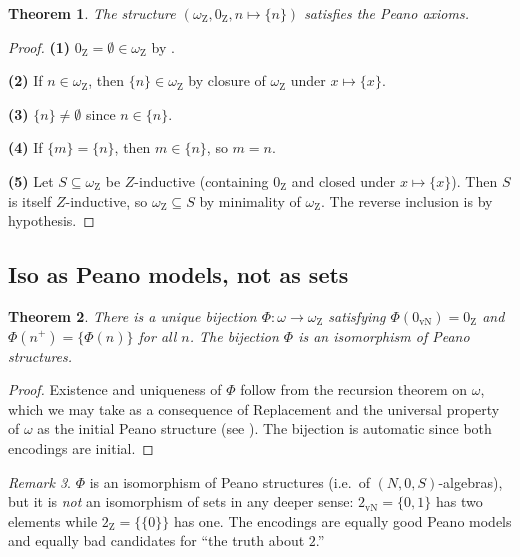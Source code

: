 \documentclass[12pt]{article}
\newtheorem{theorem}{Theorem}[section]
\theoremstyle{definition}
\theoremstyle{remark}
\newtheorem{remark}[theorem]{Remark}
\begin{document}
\begin{theorem}\label{thm:peano-Z}
The structure $(\omega_{\mathrm{Z}}, 0_{\mathrm{Z}}, n \mapsto \{n\})$ satisfies
the Peano axioms.
\end{theorem}

\begin{proof}
\textbf{(1)} $0_{\mathrm{Z}} = \emptyset \in \omega_{\mathrm{Z}}$ by
.

\textbf{(2)} If $n \in \omega_{\mathrm{Z}}$, then $\{n\} \in \omega_{\mathrm{Z}}$
by closure of $\omega_{\mathrm{Z}}$ under $x \mapsto \{x\}$.

\textbf{(3)} $\{n\} \neq \emptyset$ since $n \in \{n\}$.

\textbf{(4)} If $\{m\} = \{n\}$, then $m \in \{n\}$, so $m = n$.

\textbf{(5)} Let $S \subseteq \omega_{\mathrm{Z}}$ be $Z$-inductive (containing
$0_{\mathrm{Z}}$ and closed under $x \mapsto \{x\}$). Then $S$ is itself
$Z$-inductive, so $\omega_{\mathrm{Z}} \subseteq S$ by minimality of
$\omega_{\mathrm{Z}}$. The reverse inclusion is by hypothesis.
\end{proof}

\subsection{Iso as Peano models, not as sets}

\begin{theorem}\label{thm:peano-iso}
There is a unique bijection $\Phi: \omega \to \omega_{\mathrm{Z}}$ satisfying
$\Phi(0_{\mathrm{vN}}) = 0_{\mathrm{Z}}$ and
$\Phi(n^+) = \{\Phi(n)\}$ for all $n$. The bijection $\Phi$ is an isomorphism
of Peano structures.
\end{theorem}

\begin{proof}
Existence and uniqueness of $\Phi$ follow from the recursion theorem on
$\omega$, which we may take as a consequence of Replacement and the
universal property of $\omega$ as the initial Peano structure (see
). The bijection is automatic since both encodings
are initial.
\end{proof}

\begin{remark}
$\Phi$ is an isomorphism of Peano structures (i.e.\ of $(N, 0, S)$-algebras),
but it is \emph{not} an isomorphism of sets in any deeper sense:
$2_{\mathrm{vN}} = \{0,1\}$ has two elements while $2_{\mathrm{Z}} = \{\{0\}\}$
has one. The encodings are equally good Peano models and equally bad
candidates for ``the truth about $2$.''
\end{remark}
\end{document}
